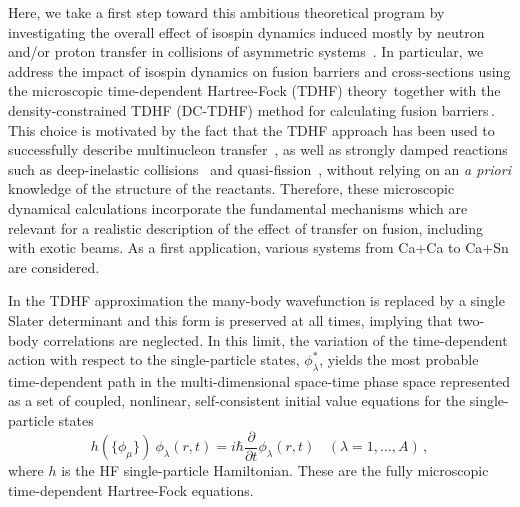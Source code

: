 \documentclass[aps,prl,twocolumn,superscriptaddress,floatfix,10pt]{revtex4-1}
\begin{document}
Here, we take a first step toward this ambitious theoretical program by investigating the overall effect of isospin dynamics induced mostly by neutron and/or proton transfer in collisions of asymmetric systems~\cite{dasso1985,chomaz1993,baran1996,baran2001,simenel2001,baran2005,simenel2007,baran2009,oberacker2012,umar2008a}.
In particular, we address the impact of isospin dynamics on fusion barriers and cross-sections using
the microscopic
time-dependent Hartree-Fock (TDHF) theory\,\cite{negele1982,simenel2012}
together with the density-constrained TDHF (DC-TDHF) method for calculating fusion barriers\,\cite{umar2006b}.
This choice is motivated by the fact that the TDHF approach has been used to successfully describe multinucleon transfer~\cite{simenel2010,simenel2012b,sekizawa2013,scamps2013a,bourgin2016}, as well as strongly damped reactions such as deep-inelastic collisions~\cite{koonin1977,simenel2011} and quasi-fission~\cite{wakhle2014,umar2015a,umar2016}, without relying on an {\it a priori} knowledge of the structure of the reactants.
Therefore, these microscopic dynamical calculations incorporate the fundamental mechanisms which are relevant for a realistic description of the effect of transfer on fusion, including with exotic beams.
As a first application, various systems from Ca+Ca to Ca+Sn are considered.

In the TDHF approximation the many-body wavefunction is replaced by a single
Slater determinant and this form is preserved at all times, implying that two-body correlations
are neglected.
In this limit, the
variation of the time-dependent action with respect to the single-particle states, $\phi^{*}_{\lambda}$, yields the most probable time-dependent path
in the multi-dimensional space-time phase space
represented as a
set of coupled, nonlinear, self-consistent initial value equations
for the single-particle states
\begin{equation}
h(\{\phi_{\mu}\}) \ \phi_{\lambda} (r,t) = i \hbar \frac{\partial}{\partial t} \phi_{\lambda} (r,t)
\ \ \ \ (\lambda = 1,...,A)\,,
\label{eq:TDHF}
\end{equation}
where $h$ is the HF single-particle Hamiltonian.
These are the fully microscopic time-dependent Hartree-Fock equations.
\end{document}
